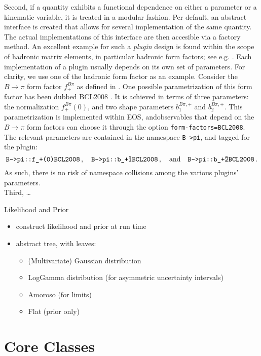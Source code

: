 Second, if a quantity exhibits a functional dependence on either a parameter or a kinematic variable,
it is treated in a modular fashion. Per default, an abstract interface is created that allows for
several implementation of the same quantity. The actual implementations of this interface are then
accesible via a factory method. An excellent example for such a \emph{plugin} design is found within
the scope of hadronic matrix elements, in particular hadronic form factors; see e.g.
. Each implementation of a plugin usually depends on its own set of
parameters. For clarity, we use one of the hadronic form factor as an example. Consider the $B\to
\pi$ form factor $f^{B\pi}_+$ as defined in . One possible
parametrization of this form factor has been dubbed BCL2008 \cite{}. It is achieved in terms of
three parameters: the normalization $f^{B\pi}_+(0)$, and two shape parameters $b^{B\pi,+}_1$ and
$b^{B\pi,+}_2$. This parametrization is implemented within EOS, andobservables that depend on the
$B\to \pi$ form factors can choose it through the option \texttt{form-factors=BCL2008}. The relevant
parameters are contained in the namespace \texttt{B->pi}, and tagged for the  plugin:
\begin{equation}
    \texttt{B->pi::f\_+(0)\@BCL2008}\,,\quad\texttt{B->pi::b\_+\^1\@BCL2008}\,,
    \quad\text{and}\quad\texttt{B->pi::b\_+\^2\@BCL2008}\,.
\end{equation}
As such, there is no risk of namespace collisions among the various plugins' parameters.\\


Third, \dots

{Likelihood and Prior}
\begin{itemize}
    \item construct likelihood and prior at run time
    \item abstract tree, with leaves:
    \begin{itemize}
        \item (Multivariate) Gaussian distribution
        \item LogGamma distribution (for asymmetric uncertainty intervals)
        \item Amoroso (for limits)
        \item Flat (prior only)
    \end{itemize}
\end{itemize}


\section{Core Classes}
\label{sec:interface:classes}

